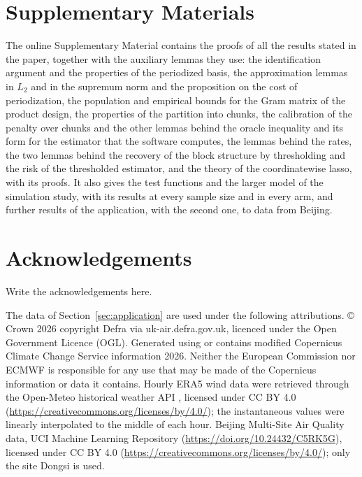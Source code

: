 \section*{Supplementary Materials}

The online Supplementary Material contains the proofs of all the results
stated in the paper, together with the auxiliary lemmas they use: the
identification argument and the properties of the periodized basis, the
approximation lemmas in $L_2$ and in the supremum norm and the proposition on
the cost of periodization, the population and empirical bounds for the Gram
matrix of the product design, the properties of the
partition into chunks, the calibration of the penalty over chunks and the
other lemmas behind the oracle inequality and its form for the
estimator that the software computes,
 the lemmas behind the rates,  the  two lemmas behind
the recovery of the block structure by thresholding and the risk of
the thresholded estimator, and the theory of the coordinatewise lasso, with
its proofs. It also gives the test functions and the larger
model of the simulation study, with its results at every sample size and in
every arm, and further results of the application, with the second one, to
data from Beijing.

\section*{Acknowledgements}

Write the acknowledgements here.
\par

The data of Section~\ref{sec:application} are used under the following
attributions. \copyright{} Crown 2026 copyright Defra via
uk-air.defra.gov.uk, licenced under the Open Government Licence (OGL).
Generated using or contains modified Copernicus Climate Change Service
information 2026. Neither the European Commission nor ECMWF is responsible
for any use that may be made of the Copernicus information or data it
contains. Hourly ERA5 wind data were retrieved through the Open-Meteo
historical weather API
\citetext{\citealp{Zippenfenig-OpenMeteo-2024}; \url{https://open-meteo.com/}},
licensed under CC BY 4.0 (\url{https://creativecommons.org/licenses/by/4.0/});
the instantaneous values were linearly interpolated to the middle of each
hour. Beijing Multi-Site Air Quality data, UCI Machine Learning Repository
(\url{https://doi.org/10.24432/C5RK5G}), licensed under CC BY 4.0
(\url{https://creativecommons.org/licenses/by/4.0/}); only the site Dongsi is
used.
\par


